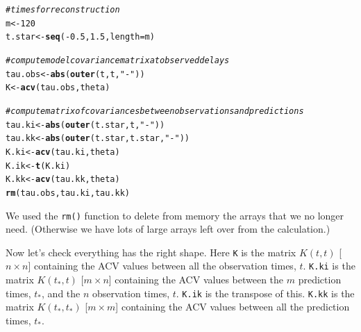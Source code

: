 \documentclass[a4paper, 11pt, amsmath, graphicx]{article}\usepackage[]{graphicx}\usepackage[]{color}
\makeatletter
\newcommand{\hlnum}[1]{\textcolor[rgb]{0.686,0.059,0.569}{#1}}%
\newcommand{\hlstr}[1]{\textcolor[rgb]{0.192,0.494,0.8}{#1}}%
\newcommand{\hlcom}[1]{\textcolor[rgb]{0.678,0.584,0.686}{\textit{#1}}}%
\newcommand{\hlopt}[1]{\textcolor[rgb]{0,0,0}{#1}}%
\newcommand{\hlstd}[1]{\textcolor[rgb]{0.345,0.345,0.345}{#1}}%
\newcommand{\hlkwb}[1]{\textcolor[rgb]{0.69,0.353,0.396}{#1}}%
\newcommand{\hlkwc}[1]{\textcolor[rgb]{0.333,0.667,0.333}{#1}}%
\newcommand{\hlkwd}[1]{\textcolor[rgb]{0.737,0.353,0.396}{\textbf{#1}}}%
\newenvironment{kframe}{%
 \def\at@end@of@kframe{}%
 \ifinner\ifhmode%
  \def\at@end@of@kframe{\end{minipage}}%
  \begin{minipage}{\columnwidth}%
 \fi\fi%
 \def\FrameCommand##1{\hskip\@totalleftmargin \hskip-\fboxsep
 \colorbox{shadecolor}{##1}\hskip-\fboxsep
     \hskip-\linewidth \hskip-\@totalleftmargin \hskip\columnwidth}%
 \MakeFramed {\advance\hsize-\width
   \@totalleftmargin\z@ \linewidth\hsize
   \@setminipage}}%
 {\par\unskip\endMakeFramed%
 \at@end@of@kframe}
\newenvironment{knitrout}{}{} %
\makeatother
\begin{document}
\begin{knitrout}
\color{fgcolor}\begin{kframe}
\begin{alltt}
\hlcom{# times for reconstruction}
  \hlstd{m} \hlkwb{<-} \hlnum{120}
  \hlstd{t.star} \hlkwb{<-} \hlkwd{seq}\hlstd{(}\hlopt{-}\hlnum{0.5}\hlstd{,} \hlnum{1.5}\hlstd{,} \hlkwc{length} \hlstd{= m)}

\hlcom{# compute model covariance matrix at observed delays}
  \hlstd{tau.obs} \hlkwb{<-} \hlkwd{abs}\hlstd{(} \hlkwd{outer}\hlstd{(t, t,} \hlstr{"-"}\hlstd{) )}
  \hlstd{K} \hlkwb{<-} \hlkwd{acv}\hlstd{(tau.obs, theta)}

\hlcom{# compute matrix of covariances between observations and predictions}
  \hlstd{tau.ki} \hlkwb{<-} \hlkwd{abs}\hlstd{(} \hlkwd{outer}\hlstd{(t.star, t,} \hlstr{"-"}\hlstd{) )}
  \hlstd{tau.kk} \hlkwb{<-} \hlkwd{abs}\hlstd{(} \hlkwd{outer}\hlstd{(t.star, t.star,} \hlstr{"-"}\hlstd{) )}
  \hlstd{K.ki} \hlkwb{<-} \hlkwd{acv}\hlstd{(tau.ki, theta)}
  \hlstd{K.ik} \hlkwb{<-} \hlkwd{t}\hlstd{(K.ki)}
  \hlstd{K.kk} \hlkwb{<-} \hlkwd{acv}\hlstd{(tau.kk, theta)}
  \hlkwd{rm}\hlstd{(tau.obs, tau.ki, tau.kk)}
\end{alltt}
\end{kframe}
\end{knitrout}

We used the {\tt rm()} function to delete from memory the arrays that we no longer need. (Otherwise we have lots of large arrays left over from the calculation.)

Now let's check everything has the right shape. Here {\tt K} is the matrix $K(t, t)$ [$n \times n$] containing the ACV values between all the observation times, $t$. {\tt K.ki} is the matrix $K(t_*, t)$ [$m \times n$] containing the ACV values between the $m$ prediction times, $t_*$, and the $n$ observation times, $t$. {\tt K.ik} is the transpose of this. {\tt K.kk} is the matrix $K(t_*, t_*)$ [$m \times m$] containing the ACV values between all the prediction times, $t_*$.
\end{document}
